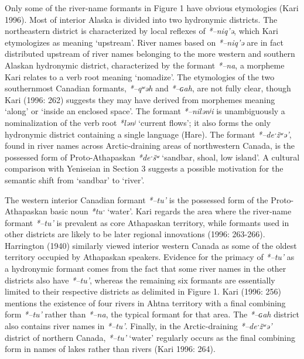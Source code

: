 Only some of the river-name formants in Figure 1 have obvious etymologies (Kari 1996). Most of interior Alaska is divided into two hydronymic districts. The northeastern district is characterized by local reflexes of \textit{*–niq’ə}, which Kari etymologizes as meaning ‘upstream’. River names based on \textit{*–niq’ə} are in fact distributed upstream of river names belonging to the more western and southern Alaskan hydronymic district, characterized by the formant \textit{*–na}, a morpheme Kari relates to a verb root meaning ‘nomadize’. The etymologies of the two southernmost Canadian formants, \textit{*–qʷəh} and \textit{*–ɢah}, are not fully clear, though Kari (1996: 262) suggests they may have derived from morphemes meaning ‘along’ or ‘inside an enclosed space’. The formant \textit{*–nilənʲi} is unambiguously a nominalization of the verb root \textit{*lənʲ }‘current flows’; it also forms the only hydronymic district containing a single language (Hare). The formant \textit{*–deˑžʷə’}, found in river names across Arctic-draining areas of northwestern Canada, is the possessed form of Proto-Athapaskan \textit{*deˑšʷ} ‘sandbar, shoal, low island’. A cultural comparison with Yeniseian in Section 3 suggests a possible motivation for the semantic shift from ‘sandbar’ to ‘river’.

The western interior Canadian formant \textit{*–tu’} is the possessed form of the Proto-Athapaskan basic noun \textit{*tuˑ} ‘water’. Kari regards the area where the river-name formant \textit{*–tu’ }is prevalent as core Athapaskan territory, while formants used in other districts are likely to be later regional innovations (1996: 263-266). Harrington (1940) similarly viewed interior western Canada as some of the oldest territory occupied by Athapaskan speakers. Evidence for the primacy of \textit{*–tu’ }as a hydronymic formant comes from the fact that some river names in the other districts also have \textit{*–tu’}, whereas the remaining six formants are essentially limited to their respective districts as delimited in Figure 1.\textit{ }Kari (1996: 256) mentions the existence of four rivers in Ahtna territory with a final combining form \textit{*–tu’ }rather than \textit{*–na}, the typical formant for that area. The \textit{*–ɢah} district also contains river names in \textit{*–tu’}. Finally, in the Arctic-draining \textit{*–deˑžʷə’} district of northern Canada, \textit{*–tu’} ‘water’ regularly occurs as the final combining form in names of lakes rather than rivers (Kari 1996: 264).

